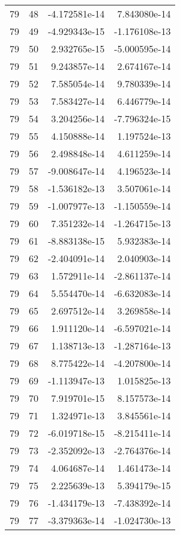 \begin{tabular}{rrrr}
  79 &   48 & -4.172581e-14 &  7.843080e-14 \\
  79 &   49 & -4.929343e-15 & -1.176108e-13 \\
  79 &   50 &  2.932765e-15 & -5.000595e-14 \\
  79 &   51 &  9.243857e-14 &  2.674167e-14 \\
  79 &   52 &  7.585054e-14 &  9.780339e-14 \\
  79 &   53 &  7.583427e-14 &  6.446779e-14 \\
  79 &   54 &  3.204256e-14 & -7.796324e-15 \\
  79 &   55 &  4.150888e-14 &  1.197524e-13 \\
  79 &   56 &  2.498848e-14 &  4.611259e-14 \\
  79 &   57 & -9.008647e-14 &  4.196523e-14 \\
  79 &   58 & -1.536182e-13 &  3.507061e-14 \\
  79 &   59 & -1.007977e-13 & -1.150559e-14 \\
  79 &   60 &  7.351232e-14 & -1.264715e-13 \\
  79 &   61 & -8.883138e-15 &  5.932383e-14 \\
  79 &   62 & -2.404091e-14 &  2.040903e-14 \\
  79 &   63 &  1.572911e-14 & -2.861137e-14 \\
  79 &   64 &  5.554470e-14 & -6.632083e-14 \\
  79 &   65 &  2.697512e-14 &  3.269858e-14 \\
  79 &   66 &  1.911120e-14 & -6.597021e-14 \\
  79 &   67 &  1.138713e-13 & -1.287164e-13 \\
  79 &   68 &  8.775422e-14 & -4.207800e-14 \\
  79 &   69 & -1.113947e-13 &  1.015825e-13 \\
  79 &   70 &  7.919701e-15 &  8.157573e-14 \\
  79 &   71 &  1.324971e-13 &  3.845561e-14 \\
  79 &   72 & -6.019718e-15 & -8.215411e-14 \\
  79 &   73 & -2.352092e-13 & -2.764376e-14 \\
  79 &   74 &  4.064687e-14 &  1.461473e-14 \\
  79 &   75 &  2.225639e-13 &  5.394179e-15 \\
  79 &   76 & -1.434179e-13 & -7.438392e-14 \\
  79 &   77 & -3.379363e-14 & -1.024730e-13 \\

\end{tabular}
